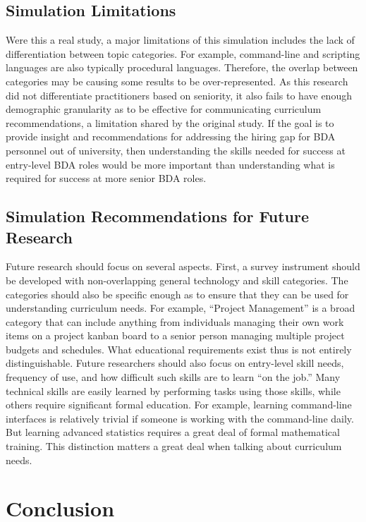 \subsection{Simulation Limitations}

Were this a real study, a major limitations of this simulation includes the lack of differentiation between topic categories. For example, command-line and scripting languages are also typically procedural languages. Therefore, the overlap between categories may be causing some results to be over-represented. As this research did not differentiate practitioners based on seniority, it also fails to have enough demographic granularity as to be effective for communicating curriculum recommendations, a limitation shared by the original study. If the goal is to provide insight and recommendations for addressing the hiring gap for BDA personnel out of university, then understanding the skills needed for success at entry-level BDA roles would be more important than understanding what is required for success at more senior BDA roles.

\subsection{Simulation Recommendations for Future Research}

Future research should focus on several aspects. First, a survey instrument should be developed with non-overlapping general technology and skill categories. The categories should also be specific enough as to ensure that they can be used for understanding curriculum needs. For example, ``Project Management'' is a broad category that can include anything from individuals managing their own work items on a project kanban board to a senior person managing multiple project budgets and schedules. What educational requirements exist thus is not entirely distinguishable. Future researchers should also focus on entry-level skill needs, frequency of use, and how difficult such skills are to learn ``on the job.'' Many technical skills are easily learned by performing tasks using those skills, while others require significant formal education. For example, learning command-line interfaces is relatively trivial if someone is working with the command-line daily. But learning advanced statistics requires a great deal of formal mathematical training. This distinction matters a great deal when talking about curriculum needs.

\section{Conclusion}

